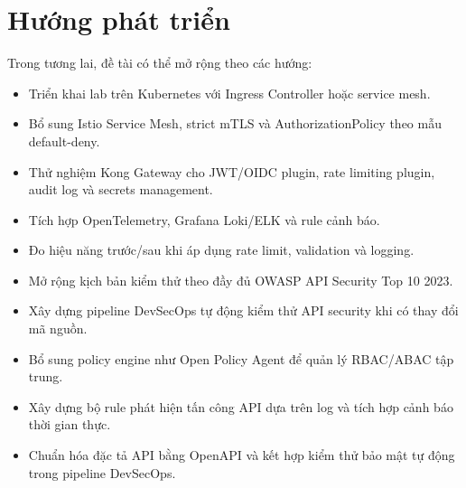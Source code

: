 \documentclass[14pt,a4paper]{extreport}
\begin{document}
\section{Hướng phát triển}
Trong tương lai, đề tài có thể mở rộng theo các hướng:
\begin{itemize}
  \item Triển khai lab trên Kubernetes với Ingress Controller hoặc service mesh.
  \item Bổ sung Istio Service Mesh, strict mTLS và AuthorizationPolicy theo mẫu default-deny.
  \item Thử nghiệm Kong Gateway cho JWT/OIDC plugin, rate limiting plugin, audit log và secrets management.
  \item Tích hợp OpenTelemetry, Grafana Loki/ELK và rule cảnh báo.
  \item Đo hiệu năng trước/sau khi áp dụng rate limit, validation và logging.
  \item Mở rộng kịch bản kiểm thử theo đầy đủ OWASP API Security Top 10 2023.
  \item Xây dựng pipeline DevSecOps tự động kiểm thử API security khi có thay đổi mã nguồn.
  \item Bổ sung policy engine như Open Policy Agent để quản lý RBAC/ABAC tập trung.
  \item Xây dựng bộ rule phát hiện tấn công API dựa trên log và tích hợp cảnh báo thời gian thực.
  \item Chuẩn hóa đặc tả API bằng OpenAPI và kết hợp kiểm thử bảo mật tự động trong pipeline DevSecOps.
\end{itemize}
\end{document}
